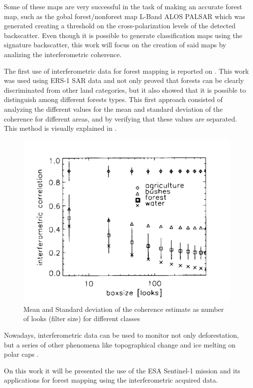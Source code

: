 Some of these maps are very successful in the task of making an accurate forest map, such as the gobal forest/nonforest map L-Band ALOS PALSAR which was generated creating a threshold on the cross-polarization levels of the detected backscatter. Even though it is possible to generate classification maps using the signature backscatter, this work will focus on the creation of said maps by analizing the interferometric coherence.

The first use of interferometric data for forest mapping is reported on \cite{first_interferometric}. This work was used using ERS-1 SAR data and not only proved that forests can be clearly discriminated from other land categories, but it also showed that it is possible to distinguish among different forests types. This first approach consisted of analyzing the different values for the mean and standard deviation of the coherence for different areas, and by verifying that these values are separated. This method is visually explained in .

\begin{figure}[H]
    \centering
    \includegraphics[width=0.7\linewidth]{Cap2/first_interferometric.png}
    \caption{Mean and Standard deviation of the coherence estimate as number of looks (filter size) for different classes}
    \label{fig:first_interferometric_estimate}
\end{figure}

Nowadays, interferometric data can be used to monitor not only deforestation, but a series of other phenomena like topographical change and ice melting on polar caps \cite{Paolathesis}. 

On this work it will be presented the use of the ESA Sentinel-1 mission and its applications for forest mapping using the interferometric acquired data.


